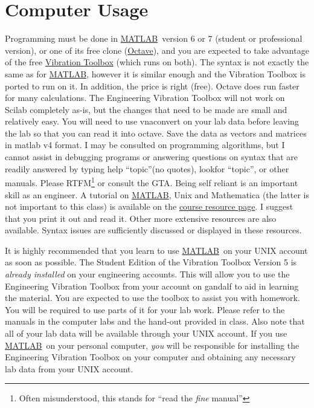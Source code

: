\documentclass[10pt]{article}
\newcommand{\comp}[1]{{{\small\textsf{#1}}}}
\newcommand{\matlab}{\href{http://www.mathworks.com}{M{\small ATLAB}}}
\begin{document}
\section{Computer Usage}
Programming must be done in \matlab\  version 6 or 7 (student or professional version), or one of its free clone (\href{http://www.octave.org/}{Octave}), and you are expected to take advantage of the free \href{http://www.cs.wright.edu/vtoolbox}{Vibration Toolbox} (which runs on both).  The syntax is not exactly the same as for \matlab, however it is similar enough and the  Vibration Toolbox is ported to run on it. In addition, the price is right (free). Octave does run faster for many calculations. The Engineering Vibration Toolbox will not work on Scilab completely as-is, but the changes that need to be made are small and relatively easy. You will need to use \comp{vnaconvert} on your lab data before leaving the lab so that you can read it into octave. Save the data as vectors and matrices in matlab v4 format. 
I may be consulted on programming algorithms, but I cannot assist in debugging programs or answering questions on syntax that are readily answered by typing \comp{help ``topic''}(no quotes),  \comp{lookfor ``topic''}, or other manuals. Please RTFM\footnote{Often misunderstood, this stands for ``read the \emph{fine} manual''} or consult the GTA. Being self reliant is an important skill as an engineer. A tutorial on \matlab, Unix and Mathematica (the latter is not important to this class) is available on the \href{http://www.cs.wright.edu/people/faculty/jslater/classes/vibration.html}{course resource page}.  I suggest that you print it out and read it.  Other more extensive resources are also available.  Syntax issues are sufficiently discussed or displayed in these resources.  %

It is highly recommended that you learn to use \matlab\  on your UNIX account as soon as possible.  The Student Edition of the Vibration Toolbox Version 5 is \emph{already installed} on your engineering accounts.  This will allow you to use the Engineering Vibration Toolbox from your account on \comp{gandalf} to aid in learning the material.  You are expected to use the toolbox to assist you with homework.  You will be required to use parts of it for your lab work.  Please refer to the manuals in the computer labs and the hand-out provided in class.  Also note that all of your lab data will be available through your UNIX account.  If you use \matlab\  on your personal computer, \emph{you} will be responsible for installing the Engineering Vibration Toolbox on your computer and obtaining any necessary lab data from your UNIX account.
\end{document}
